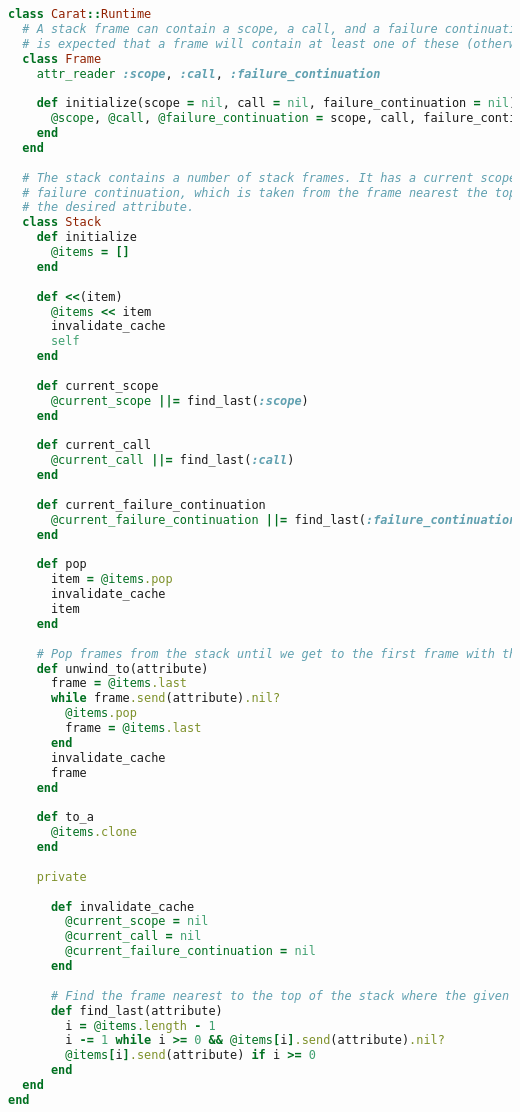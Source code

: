 \begin{lstlisting}[title={\small\ttfamily\bfseries runtime/stack.rb},language=Ruby]
class Carat::Runtime
  # A stack frame can contain a scope, a call, and a failure continuation. All are optional, but it
  # is expected that a frame will contain at least one of these (otherwise it is pretty useless).
  class Frame
    attr_reader :scope, :call, :failure_continuation
    
    def initialize(scope = nil, call = nil, failure_continuation = nil)
      @scope, @call, @failure_continuation = scope, call, failure_continuation
    end
  end
  
  # The stack contains a number of stack frames. It has a current scope, current call and current
  # failure continuation, which is taken from the frame nearest the top of the stack which has
  # the desired attribute.
  class Stack
    def initialize
      @items = []
    end
    
    def <<(item)
      @items << item
      invalidate_cache
      self
    end
    
    def current_scope
      @current_scope ||= find_last(:scope)
    end
    
    def current_call
      @current_call ||= find_last(:call)
    end
    
    def current_failure_continuation
      @current_failure_continuation ||= find_last(:failure_continuation)
    end
    
    def pop
      item = @items.pop
      invalidate_cache
      item
    end
    
    # Pop frames from the stack until we get to the first frame with the given attribute
    def unwind_to(attribute)
      frame = @items.last
      while frame.send(attribute).nil?
        @items.pop
        frame = @items.last
      end
      invalidate_cache
      frame
    end
    
    def to_a
      @items.clone
    end
    
    private
    
      def invalidate_cache
        @current_scope = nil
        @current_call = nil
        @current_failure_continuation = nil
      end
      
      # Find the frame nearest to the top of the stack where the given attribute is non-nil
      def find_last(attribute)
        i = @items.length - 1
        i -= 1 while i >= 0 && @items[i].send(attribute).nil?
        @items[i].send(attribute) if i >= 0
      end
  end
end

\end{lstlisting}
